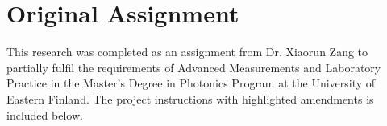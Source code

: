 \documentclass[12pt,a4paper]{article}
\begin{document}
%
%
%
%
%
%
%
%
%
\newpage
\appendix
\section{Original Assignment}
\vspace*{\fill}
This research was completed as an assignment from Dr. Xiaorun Zang to partially fulfil the requirements of Advanced Measurements and Laboratory Practice in the Master's Degree in Photonics Program at the University of Eastern Finland. The project instructions with highlighted amendments is included below.
\vspace*{\fill}

\end{document}

